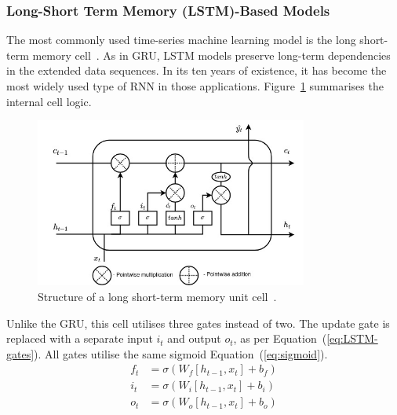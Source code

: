 %
\subsubsection{Long-Short Term Memory (LSTM)-Based Models} \label{subsub:lstm}
The most commonly used time-series machine learning model is the long short-term memory cell~\cite{LSTM_Hochreiter1997}.
As in GRU, LSTM models preserve long-term dependencies in the extended data sequences.
In its ten years of existence, it has become the most widely used type of RNN in those applications.
\mbox{Figure~\ref{fig:LSTM-cell}} summarises the internal cell logic.
\begin{figure}[H]%
    \includegraphics[width=0.80\textwidth]{II_Body/LSTM/images/LSTM.jpg}
    \caption{Structure of a long short-term memory unit cell~\cite{LSTM_Hochreiter1997}.}
    \label{fig:LSTM-cell}
\end{figure}    
Unlike the GRU, this cell utilises three gates instead of two.
The update gate is replaced with a separate input $i_t$ and output $o_t$, as per \mbox{Equation~(\ref{eq:LSTM-gates})}.
All gates utilise the same sigmoid \mbox{Equation~(\ref{eq:sigmoid})}.
\begin{equation}
    \begin{split}
        f_t &= \sigma \left( W_f \left[ h_{t-1}, x_t \right] + b_f \right) \\
        i_t &= \sigma \left( W_i \left[ h_{t-1}, x_t \right] + b_i \right) \\
        o_t &= \sigma \left( W_o \left[ h_{t-1}, x_t \right] + b_o \right) \\
    \end{split}
    \label{eq:LSTM-gates}
\end{equation}

